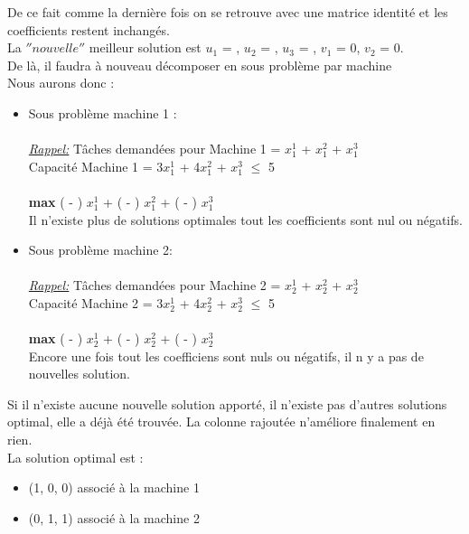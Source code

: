 De ce fait comme la dernière fois on se retrouve avec une matrice identité et les coefficients restent inchangés. \\
La \textit{$''nouvelle''$} meilleur solution est \textit{$u_1$} = ,  \textit{$u_2$} = , \textit{$u_3$} = , \textit{$v_1$} = 0, \textit{$v_2$} = 0.    
\\
De là, il faudra à nouveau décomposer en sous problème par machine
\\
Nous aurons donc : 
\\
\begin{itemize}
\item{
Sous problème machine 1 : \\ \\ 
\textit{\underline{Rappel:}}  Tâches demandées pour Machine 1 =  $x_1^1$ + $x_1^2$ + $x_1^3$  \\ 
Capacité Machine 1 = 3$x_1^1$ + 4$x_1^2$ + $x_1^3$ $\leq$ 5
\\ \\ 
\textbf{max} (  -  ) $x_1^1$ + ( -  ) $x_1^2$ + ( -  ) $x_1^3$
\\
 Il n'existe plus de solutions optimales tout les coefficients sont nul ou négatifs. 
 \\

}

\item{
Sous problème machine 2: 
\\
\\
\textit{\underline{Rappel:}}  Tâches demandées pour Machine 2 =  $x_2^1$ + $x_2^2$ + $x_2^3$  \\ 
Capacité Machine 2 = 3$x_2^1$ + 4$x_2^2$ + $x_2^3$ $\leq$ 5
\\ \\ 
\textbf{max} (  -  ) $x_2^1$ + ( -  ) $x_2^2$ + ( - ) $x_2^3$
\\
Encore une fois tout les coefficiens sont nuls ou négatifs, il n y a pas de nouvelles solution.
}
\end{itemize}

Si il n'existe aucune nouvelle solution apporté, il n'existe pas d'autres solutions optimal, elle a déjà été trouvée. La colonne rajoutée n'améliore finalement en rien.
\\
La solution optimal est :
\begin{itemize}
\item{(1, 0, 0) associé à la machine 1}
\item{(0, 1, 1) associé à la machine 2}
\end{itemize}










